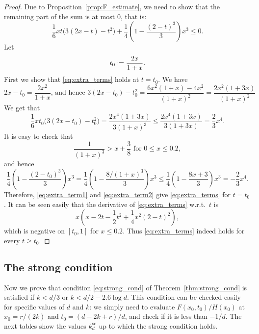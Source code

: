 \documentclass[12pt]{amsart}
\theoremstyle{definition}
\newcommand{\defeq}{\mathrel{\vcenter{\baselineskip0.5ex \lineskiplimit0pt
                     \hbox{\scriptsize.}\hbox{\scriptsize.}}}%
                     =}
\begin{document}
\begin{proof}
Due to Proposition~\ref{prop:F_estimate}, we need to show that the remaining part of the sum is at most $0$, that is:
%
\begin{equation} \label{eq:extra_terms}
\frac16xt \bigg( 3(2x-t) - t^2 \bigg) 
+ \frac14 \left( 1- \frac{(2-t)^3}{3} \right)x^3 \leq 0. 
\end{equation}
%
Let 
%
\[ t_0 \defeq \frac{2x}{1+x} .\]
%
First we show that \eqref{eq:extra_terms} holds at $t=t_0$. We have 
%
\[ 2x-t_0= \frac{2x^2}{1+x} 
\text{, and hence } 
3(2x-t_0)-t_0^2 = \frac{6x^2(1+x)-4x^2}{(1+x)^2} 
= \frac{2x^2(1+3x)}{(1+x)^2}
\]
%
We get that 
%
\begin{equation} \label{eq:extra_term1}
\frac16xt_0 \bigg( 3(2x-t_0) - t_0^2 \bigg) 
= \frac{2x^4(1+3x)}{3(1+x)^3} 
\leq \frac{2x^4(1+3x)}{3(1+3x)} 
= \frac23 x^4 .
\end{equation}
%
It is easy to check that   
%
\[ \frac{1}{(1+x)^3} > x + \frac38 
\text{ for } 0 \leq x \leq 0.2 ,\]
and hence 
%
\begin{equation} \label{eq:extra_term2}
\frac14 \left( 1- \frac{(2-t_0)^3}{3} \right)x^3 
= \frac14 \left( 1- \frac{8/(1+x)^3}{3} \right)x^3 
\leq \frac14 \left( 1- \frac{8x+3}{3} \right)x^3 
= - \frac23 x^4 .
\end{equation}
%
Therefore, \eqref{eq:extra_term1} and \eqref{eq:extra_term2} give \eqref{eq:extra_terms} for $t=t_0$. It can be seen easily that the derivative of \eqref{eq:extra_terms} w.r.t.~$t$ is
%
 \[ x \left( x-2t-\frac12 t^2 + \frac14 x^2(2-t)^2 \right) ,\]
%
which is negative on $[t_0,1]$ for $x \leq 0.2$. Thus \eqref{eq:extra_terms} indeed holds for every $t \geq t_0$.
%
\end{proof}

\subsection{The strong condition}
\label{sec:strong}

Now we prove that condition \eqref{eq:strong_cond} of Theorem~\ref{thm:strong_cond} is satisfied if $k<d/3$ or $k<d/2-2.6 \log d$. This condition can be checked easily for specific values of $d$ and $k$: we simply need to evaluate $F(x_0,t_0)/H(x_0)$ at $x_0=r/(2k)$ and $t_0=(d-2k+r)/d$, and check if it is less than $-1/d$. The next tables show the values $k_d^{\textrm{sc}}$ up to which the strong condition holds. %
\end{document}
